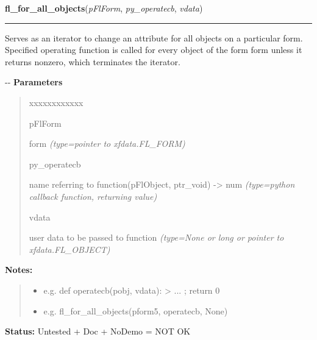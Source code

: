    \label{xformslib:flbasic:fl_for_all_objects}

    \vspace{0.5ex}

\hspace{.8\funcindent}\begin{boxedminipage}{\funcwidth}

    \raggedright \textbf{fl\_for\_all\_objects}(\textit{pFlForm}, \textit{py\_operatecb}, \textit{vdata})

    \vspace{-1.5ex}

    \rule{\textwidth}{0.5\fboxrule}
\setlength{\parskip}{2ex}

Serves as an iterator to change an attribute for all objects on a
particular form. Specified operating function is called for every object
of the form form unless it returns nonzero, which terminates the iterator.

-{}-
\setlength{\parskip}{1ex}
      \textbf{Parameters}
      \vspace{-1ex}

      \begin{quote}
        \begin{Ventry}{xxxxxxxxxxxx}

          \item[pFlForm]


form
            {\it (type=pointer to xfdata.FL\_FORM)}

          \item[py\_operatecb]


name referring to function(pFlObject, ptr\_void) -> num
            {\it (type=python callback function, returning value)}

          \item[vdata]


user data to be passed to function
            {\it (type=None or long or pointer to xfdata.FL\_OBJECT)}

        \end{Ventry}

      \end{quote}

\textbf{Notes:}
\begin{quote}
  \begin{itemize}

  \item
    \setlength{\parskip}{0.6ex}

e.g. def operatecb(pobj, vdata): > ... ; return 0


  \item 
e.g. fl\_for\_all\_objects(pform5, operatecb, None)


\end{itemize}

\end{quote}

\textbf{Status:} 
Untested + Doc + NoDemo = NOT OK


    \end{boxedminipage}

